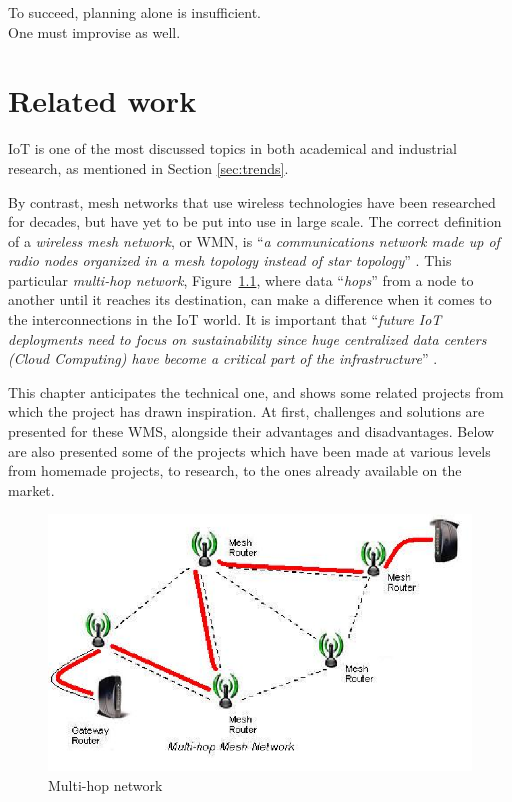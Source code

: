 
\begin{savequote}[70mm]
	To succeed, planning alone is insufficient.\\
	One must improvise as well.
\end{savequote}

\chapter{Related work}\label{chapter:related_work}

	IoT is one of the most discussed topics in both academical and industrial research, as mentioned in Section \ref{sec:trends}.
	
	By contrast, mesh networks that use wireless technologies have been researched for decades, but have yet to be put into use in large scale.
	The correct definition of a \textit{wireless mesh network}, or WMN, is ``\textit{a communications network made up of radio nodes organized in a mesh topology instead of star topology}'' \cite{wms}.	
	This particular \textit{multi-hop network}, Figure~\ref{img:multihop}, where data ``\textit{hops}'' from a node to another until it reaches its destination, can make a difference when it comes to the interconnections in the IoT world.
	It is important that ``\textit{future IoT deployments need to focus on sustainability since huge centralized data centers (Cloud Computing) have become a critical part of the infrastructure}'' \cite{7968828}.
	
	This chapter anticipates the technical one, and shows some related projects from which the project has drawn inspiration.
	At first, challenges and solutions are presented for these WMS, alongside their advantages and disadvantages.
	Below are also presented some of the projects which have been made at various levels from homemade projects, to research, to the ones already available on the market.
	
	\begin{figure}[h]
		\centering
		\includegraphics[width=\textwidth]{resources/img/chap4/mesh}
		\caption{Multi-hop network}
		\label{img:multihop}
	\end{figure}
	
